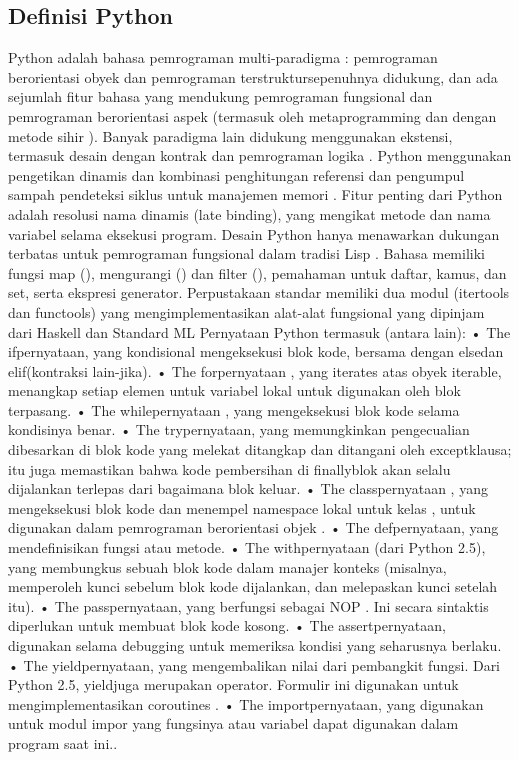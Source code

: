 \subsection{Definisi Python}
Python adalah bahasa pemrograman multi-paradigma : pemrograman berorientasi obyek dan pemrograman terstruktursepenuhnya didukung, dan ada sejumlah fitur bahasa yang mendukung pemrograman fungsional dan pemrograman berorientasi aspek (termasuk oleh metaprogramming dan dengan metode sihir ).  Banyak paradigma lain didukung menggunakan ekstensi, termasuk desain dengan kontrak  dan pemrograman logika .
Python menggunakan pengetikan dinamis dan kombinasi penghitungan referensi dan pengumpul sampah pendeteksi siklus untuk manajemen memori . Fitur penting dari Python adalah resolusi nama dinamis (late binding), yang mengikat metode dan nama variabel selama eksekusi program.
Desain Python hanya menawarkan dukungan terbatas untuk pemrograman fungsional dalam tradisi Lisp . Bahasa memiliki fungsi map (), mengurangi () dan filter (), pemahaman untuk daftar, kamus, dan set, serta ekspresi generator. Perpustakaan standar memiliki dua modul (itertools dan functools) yang mengimplementasikan alat-alat fungsional yang dipinjam dari Haskell dan Standard ML 
Pernyataan Python termasuk (antara lain):
•	The ifpernyataan, yang kondisional mengeksekusi blok kode, bersama dengan elsedan elif(kontraksi lain-jika).
•	The forpernyataan , yang iterates atas obyek iterable, menangkap setiap elemen untuk variabel lokal untuk digunakan oleh blok terpasang.
•	The whilepernyataan , yang mengeksekusi blok kode selama kondisinya benar.
•	The trypernyataan, yang memungkinkan pengecualian dibesarkan di blok kode yang melekat ditangkap dan ditangani oleh exceptklausa; itu juga memastikan bahwa kode pembersihan di finallyblok akan selalu dijalankan terlepas dari bagaimana blok keluar.
•	The classpernyataan , yang mengeksekusi blok kode dan menempel namespace lokal untuk kelas , untuk digunakan dalam pemrograman berorientasi objek .
•	The defpernyataan, yang mendefinisikan fungsi atau metode.
•	The withpernyataan (dari Python 2.5), yang membungkus sebuah blok kode dalam manajer konteks (misalnya, memperoleh kunci sebelum blok kode dijalankan, dan melepaskan kunci setelah itu).
•	The passpernyataan, yang berfungsi sebagai NOP . Ini secara sintaktis diperlukan untuk membuat blok kode kosong.
•	The assertpernyataan, digunakan selama debugging untuk memeriksa kondisi yang seharusnya berlaku.
•	The yieldpernyataan, yang mengembalikan nilai dari pembangkit fungsi. Dari Python 2.5, yieldjuga merupakan operator. Formulir ini digunakan untuk mengimplementasikan coroutines .
•	The importpernyataan, yang digunakan untuk modul impor yang fungsinya atau variabel dapat digunakan dalam program saat ini.\cite{van2007python}.

